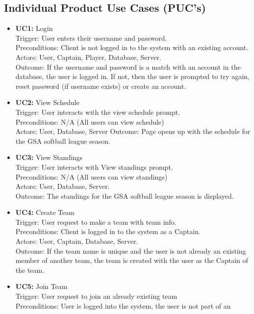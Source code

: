 \documentclass[12pt, titlepage]{article}
\begin{document}
\subsection{Individual Product Use Cases (PUC's)}
\begin{itemize}
\item \textbf{UC1:} Login \\
	Trigger: User enters their username and password.\\
	Preconditions: Client is not logged in to the system with an existing account.\\
	Actors: User, Captain, Player, Database, Server.\\
	Outcome: If the username and password is a match with an account in
	the database, the user is logged in. If not, then the user is prompted
	to try again, reset password (if username exists) or create an account.
\item \textbf{UC2:} View Schedule \\
	Trigger: User interacts with the view schedule prompt.\\
	Preconditions: N/A (All users can view schedule)\\
	Actors: User, Database, Server
	Outcome: Page opens up with the schedule for the GSA softball league season.
\item \textbf{UC3:} View Standings \\
	Trigger: User interacts with View standings prompt.\\
	Preconditions: N/A (All users can view standings)\\
	Actors: User, Database, Server.\\
	Outcome: The standings for the GSA softball league season is displayed.
\item \textbf{UC4:} Create Team \\
	Trigger: User request to make a team with team info.\\
	Preconditions: Client is logged in to the system as a Captain.\\
	Actors: User, Captain, Database, Server.\\
	Outcome: If the team name is unique and the user is not already an existing member
	of another team, the team is created with the user as the Captain of the team.
\item \textbf{UC5:} Join Team \\
	Trigger: User request to join an already existing team\\
	Preconditions: User is logged into the system, the user is not part of an

\end{itemize}
\end{document}
